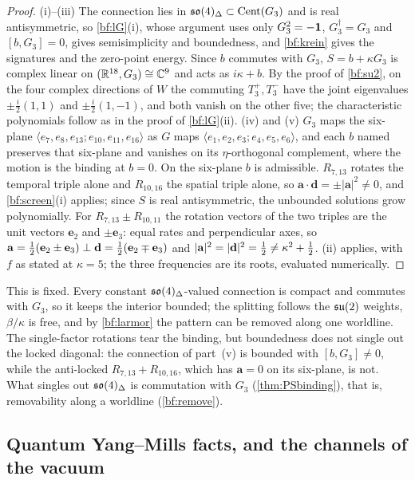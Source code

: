\begin{proof}
(i)--(iii) The connection lies in $\mathfrak{so}(4)_\Delta\subset\operatorname{Cent}(G_3)$ and is real antisymmetric, so \cref{bf:lG}(i), whose argument uses only
$G_3^2=-\mathbf 1$, $G_3^\dagger=G_3$ and $[b,G_3]=0$, gives semisimplicity and boundedness, and \cref{bf:krein} gives the signatures and the zero-point
energy. Since $b$ commutes with $G_3$, $S=b+\kappa G_3$ is complex linear on $(\mathbb{R}^{18},G_3)\cong\mathbb{C}^9$ and acts as $i\kappa+b$. By the proof of \cref{bf:su2}, on the four
complex directions of $W$ the commuting $T^+_3,T^-_3$ have the joint eigenvalues $\pm\tfrac i2(1,1)$ and $\pm\tfrac i2(1,-1)$, and both vanish on the other five; the
characteristic polynomials follow as in the proof of \cref{bf:lG}(ii). (iv) and (v) $G_3$ maps the six-plane $\langle e_7,e_8,e_{13};e_{10},e_{11},e_{16}\rangle$ as
$G$ maps $\langle e_1,e_2,e_3;e_4,e_5,e_6\rangle$, and each $b$ named preserves that six-plane and vanishes on its $\eta$-orthogonal complement, where
the motion is the binding at $b=0$. On the six-plane $b$ is admissible. $R_{7,13}$ rotates the temporal triple alone and $R_{10,16}$ the spatial
triple alone, so $\mathbf a\cdot\mathbf d=\pm|\mathbf a|^2\neq0$, and \cref{bf:screen}(i) applies; since $S$ is real antisymmetric, the unbounded
solutions grow polynomially. For $R_{7,13}\pm R_{10,11}$ the rotation vectors of the two triples are the unit vectors $\mathbf e_2$ and $\pm\mathbf e_3$:
equal rates and perpendicular axes, so $\mathbf a=\tfrac12(\mathbf e_2\pm\mathbf e_3)\perp\mathbf d=\tfrac12(\mathbf e_2\mp\mathbf e_3)$ and
$|\mathbf a|^2=|\mathbf d|^2=\tfrac12\neq\kappa^2+\tfrac12$. (ii) applies, with $f$ as stated at $\kappa=5$; the three frequencies are its
roots, evaluated numerically.
\end{proof}

This is fixed. Every constant $\mathfrak{so}(4)_\Delta$-valued connection is compact and commutes with $G_3$, so it keeps the interior bounded; the splitting
follows the $\mathfrak{su}(2)$ weights, $\beta/\kappa$ is free, and by \cref{bf:larmor} the pattern can be removed along one worldline. The single-factor
rotations tear the binding, but boundedness does not single out the locked diagonal: the connection of part~(v) is bounded with $[b,G_3]\neq0$,
while the anti-locked $R_{7,13}+R_{10,16}$, which has $\mathbf a=0$ on its six-plane, is not. What singles out $\mathfrak{so}(4)_\Delta$ is commutation with
$G_3$ (\cref{thm:PSbinding}), that is, removability along a worldline (\cref{bf:remove}).

\subsection{Quantum Yang--Mills facts, and the channels of the vacuum}
\label{sec:bf-quantum}

